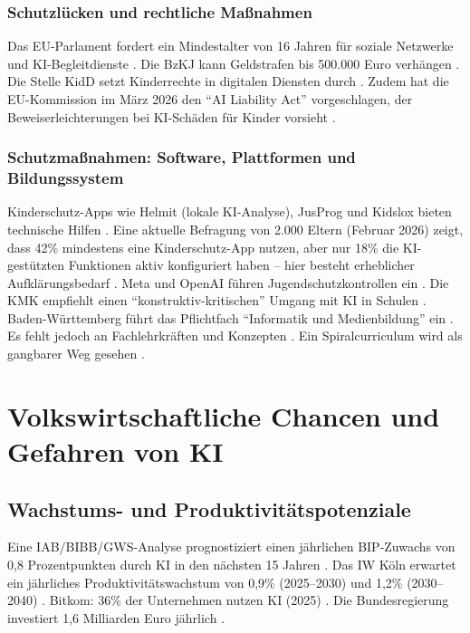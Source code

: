 \documentclass[12pt,a4paper]{article}
\begin{document}
	\subsubsection{Schutzlücken und rechtliche Maßnahmen}
	
	Das EU-Parlament fordert ein Mindestalter von 16 Jahren für soziale Netzwerke und KI-Begleitdienste \cite{EUParliament2025}. Die BzKJ kann Geldstrafen bis 500.000 Euro verhängen \cite{BzKJ2025a}. Die Stelle KidD setzt Kinderrechte in digitalen Diensten durch \cite{KidD2025}. Zudem hat die EU-Kommission im März 2026 den \enquote{AI Liability Act} vorgeschlagen, der Beweiserleichterungen bei KI-Schäden für Kinder vorsieht \cite{EUAILiability2026}.
	
	\subsubsection{Schutzmaßnahmen: Software, Plattformen und Bildungssystem}
	
	Kinderschutz-Apps wie Helmit (lokale KI-Analyse), JusProg und Kidslox bieten technische Hilfen \cite{Helmit2025, JusProg2025, Kidslox2025}. Eine aktuelle Befragung von 2.000 Eltern (Februar 2026) zeigt, dass 42\% mindestens eine Kinderschutz-App nutzen, aber nur 18\% die KI-gestützten Funktionen aktiv konfiguriert haben – hier besteht erheblicher Aufklärungsbedarf \cite{Elternstudie2026}. Meta und OpenAI führen Jugendschutzkontrollen ein \cite{Meta2025, OpenAI2025}. Die KMK empfiehlt einen \enquote{konstruktiv-kritischen} Umgang mit KI in Schulen \cite{KMK2025}. Baden-Württemberg führt das Pflichtfach \enquote{Informatik und Medienbildung} ein \cite{BW2025}. Es fehlt jedoch an Fachlehrkräften und Konzepten \cite{DLV2025}. Ein Spiralcurriculum wird als gangbarer Weg gesehen \cite{Spiralcurriculum2025}.
	
	\section{Volkswirtschaftliche Chancen und Gefahren von KI}
	
	\subsection{Wachstums- und Produktivitätspotenziale}
	
	Eine IAB/BIBB/GWS-Analyse prognostiziert einen jährlichen BIP-Zuwachs von 0,8 Prozentpunkten durch KI in den nächsten 15 Jahren \cite{IAB2025a}. Das IW Köln erwartet ein jährliches Produktivitätswachstum von 0,9\% (2025–2030) und 1,2\% (2030–2040) \cite{IW2025}. Bitkom: 36\% der Unternehmen nutzen KI (2025) \cite{Bitkom2025}. Die Bundesregierung investiert 1,6 Milliarden Euro jährlich \cite{Vention2025}.
	
\end{document}
